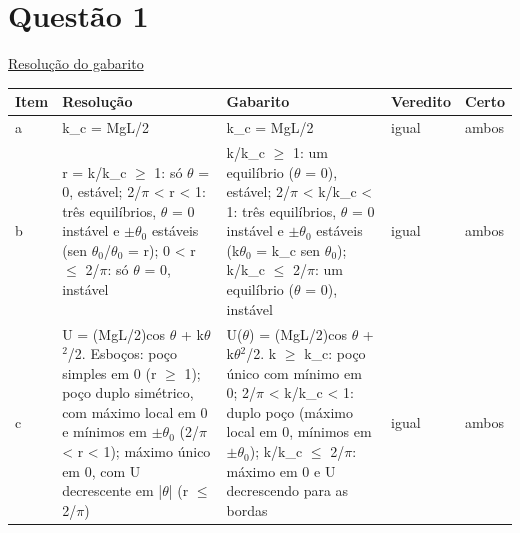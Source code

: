 \documentclass{article}%
\begin{document}
\section*{Questão 1}%
\href{https://poliedroresolve.sistemapoliedro.com.br/vestibulares/ita/2027/ita-2-fase-dia-3-22-10-2026-2-fase-dia-3/dissertativa-1-fisica-2-fase-dia-3-ita-2027}{Resolução do gabarito}\par\smallskip%
\begin{longtable}{@{}p{} p{} p{} p{} p{}@{}}\toprule Item & Resolução & Gabarito & Veredito & Certo \\ \midrule
a & k\_c = MgL/2 & k\_c = MgL/2 & igual & ambos \\
b & r = k/k\_c $\geq$ 1: só $\theta$ = 0, estável; 2/$\pi$ < r < 1: três equilíbrios, $\theta$ = 0 instável e $\pm$$\theta$$_{0}$ estáveis (sen $\theta$$_{0}$/$\theta$$_{0}$ = r); 0 < r $\leq$ 2/$\pi$: só $\theta$ = 0, instável & k/k\_c $\geq$ 1: um equilíbrio ($\theta$ = 0), estável; 2/$\pi$ < k/k\_c < 1: três equilíbrios, $\theta$ = 0 instável e $\pm$$\theta$$_{0}$ estáveis (k$\theta$$_{0}$ = k\_c sen $\theta$$_{0}$); k/k\_c $\leq$ 2/$\pi$: um equilíbrio ($\theta$ = 0), instável & igual & ambos \\
c & U = (MgL/2)cos $\theta$ + k$\theta$$^2$/2. Esboços: poço simples em 0 (r $\geq$ 1); poço duplo simétrico, com máximo local em 0 e mínimos em $\pm$$\theta$$_{0}$ (2/$\pi$ < r < 1); máximo único em 0, com U decrescente em |$\theta$| (r $\leq$ 2/$\pi$) & U($\theta$) = (MgL/2)cos $\theta$ + k$\theta$$^2$/2. k $\geq$ k\_c: poço único com mínimo em 0; 2/$\pi$ < k/k\_c < 1: duplo poço (máximo local em 0, mínimos em $\pm$$\theta$$_{0}$); k/k\_c $\leq$ 2/$\pi$: máximo em 0 e U decrescendo para as bordas & igual & ambos \\
\bottomrule\end{longtable}%
\end{document}

